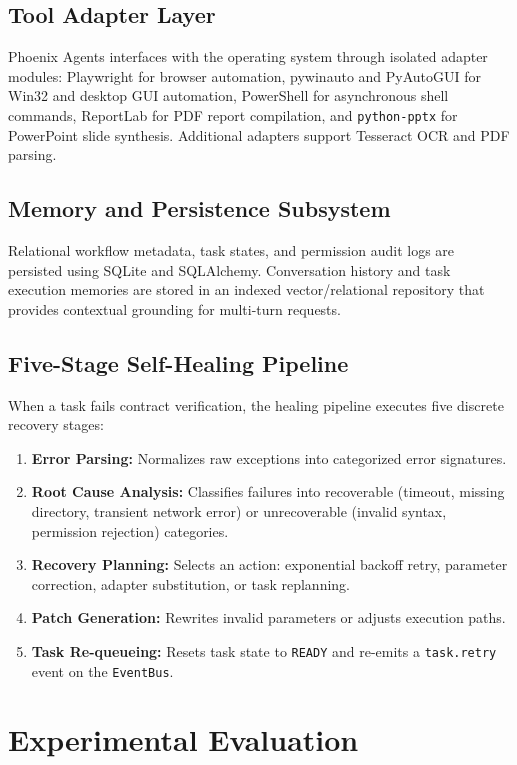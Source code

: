\documentclass[conference]{IEEEtran}
\begin{document}
\subsection{Tool Adapter Layer}
Phoenix Agents interfaces with the operating system through isolated adapter modules: Playwright for browser automation, pywinauto and PyAutoGUI for Win32 and desktop GUI automation, PowerShell for asynchronous shell commands, ReportLab for PDF report compilation, and \texttt{python-pptx} for PowerPoint slide synthesis. Additional adapters support Tesseract OCR and PDF parsing.

\subsection{Memory and Persistence Subsystem}
Relational workflow metadata, task states, and permission audit logs are persisted using SQLite and SQLAlchemy. Conversation history and task execution memories are stored in an indexed vector/relational repository that provides contextual grounding for multi-turn requests.

\subsection{Five-Stage Self-Healing Pipeline}
When a task fails contract verification, the healing pipeline executes five discrete recovery stages:
\begin{enumerate}
    \item \textbf{Error Parsing:} Normalizes raw exceptions into categorized error signatures.
    \item \textbf{Root Cause Analysis:} Classifies failures into recoverable (timeout, missing directory, transient network error) or unrecoverable (invalid syntax, permission rejection) categories.
    \item \textbf{Recovery Planning:} Selects an action: exponential backoff retry, parameter correction, adapter substitution, or task replanning.
    \item \textbf{Patch Generation:} Rewrites invalid parameters or adjusts execution paths.
    \item \textbf{Task Re-queueing:} Resets task state to \texttt{READY} and re-emits a \texttt{task.retry} event on the \texttt{EventBus}.
\end{enumerate}

\section{Experimental Evaluation}
\end{document}
